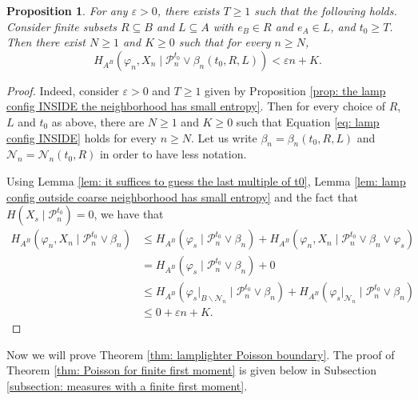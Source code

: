 \documentclass[reqno,oneside,11pt]{amsart}
\theoremstyle{plain}
\newtheorem{prop}[thm]{Proposition}
\theoremstyle{definition}
\begin{document}
\begin{prop} \label{prop: partitions pin down the n-th instant} For any $\varepsilon>0$, there exists $T\ge 1$ such that the following holds. Consider finite subsets $R\subseteq B$ and $L\subseteq A$ with $e_B\in R$ and $e_A\in L$, and $t_0\ge T$. Then there exist $N\ge 1$ and $K\ge 0$ such that for every  $n\ge N$,
	\begin{equation*}\label{eq: partitions pin down the nth instant}
		H_{A^B}\left(\varphi_n,X_n\mid \mathcal{P}_n^{t_0}\vee\beta_n(t_0,R,L)\right)<\varepsilon n +K.
	\end{equation*}
\end{prop}
\begin{proof}
	
	Indeed, consider $\varepsilon>0$ and $T\ge 1$ given by Proposition \ref{prop: the lamp config INSIDE the neighborhood has small entropy}. Then for every choice of $R$, $L$ and $t_0$ as above, there are $N\ge 1$ and $K\ge 0$ such that Equation \eqref{eq: lamp config INSIDE} holds for every $n\ge N$. Let us write $\beta_n=\beta_n(t_0,R,L)$ and $\mathcal{N}_n=\mathcal{N}_n(t_0,R)$ in order to have less notation.
	
	Using Lemma \ref{lem: it suffices to guess the last multiple of t0}, Lemma \ref{lem: lamp config outside coarse neighborhood has small entropy} and the fact that $H(X_s\mid \mathcal{P}_{n}^{t_0})=0$, we have that
	\begin{align*}
		H_{A^B}(\varphi_n,X_n\mid \mathcal{P}_n^{t_0}\vee\beta_n)&\le H_{A^B}(\varphi_s\mid \mathcal{P}_n^{t_0}\vee\beta_n)+H_{A^B}(\varphi_n,X_n\mid \mathcal{P}_n^{t_0}\vee\beta_n\vee\varphi_s)\\
		&= H_{A^B}(\varphi_s\mid \mathcal{P}_n^{t_0}\vee\beta_n) +0\\
		&\le H_{A^B}(\varphi_s|_{B\backslash \mathcal{N}_n}\mid \mathcal{P}_n^{t_0}\vee\beta_n)+H_{A^B}(\varphi_s|_{\mathcal{N}_n}\mid \mathcal{P}_n^{t_0}\vee\beta_n)\\
		&\le 0+\varepsilon n +K.
	\end{align*}
\end{proof}


Now we will prove Theorem \ref{thm: lamplighter Poisson boundary}. The proof of Theorem \ref{thm: Poisson for finite first moment} is given below in Subsection \ref{subsection: measures with a finite first moment}.
\end{document}
